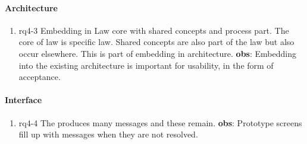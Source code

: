 \paragraph{Architecture}
\begin{enumerate}
    \item rq4-3 Embedding in 
     Law core with shared concepts and process part.
     The core of law is specific law.
     Shared concepts are also part of the law but also occur elsewhere.
     This is part of embedding in architecture.
     \newline\textbf{obs}: Embedding into the existing architecture is important for usability, in the form of acceptance.

\end{enumerate}

\paragraph{Interface}
\begin{enumerate}
    \item rq4-4 The  produces many messages and these remain.
    \newline\textbf{obs}: Prototype screens fill up with messages when they are not resolved.

\end{enumerate}


\newpage
